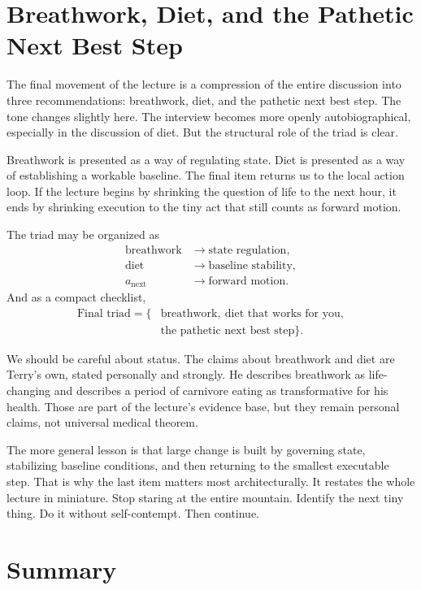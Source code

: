 \section{Breathwork, Diet, and the Pathetic Next Best Step}

The final movement of the lecture is a compression of the entire discussion into three recommendations: breathwork, diet, and the pathetic next best step. The tone changes slightly here. The interview becomes more openly autobiographical, especially in the discussion of diet. But the structural role of the triad is clear.

Breathwork is presented as a way of regulating state. Diet is presented as a way of establishing a workable baseline. The final item returns us to the local action loop. If the lecture begins by shrinking the question of life to the next hour, it ends by shrinking execution to the tiny act that still counts as forward motion.

The triad may be organized as
\begin{align}
\text{breathwork} &\rightarrow \text{state regulation},\\
\text{diet} &\rightarrow \text{baseline stability},\\
a_{\text{next}} &\rightarrow \text{forward motion}.
\end{align}
And as a compact checklist,
\begin{align}
\text{Final triad} = \{&\text{breathwork},\ \text{diet that works for you},\\
&\text{the pathetic next best step}\}.
\end{align}

We should be careful about status. The claims about breathwork and diet are Terry's own, stated personally and strongly. He describes breathwork as life-changing and describes a period of carnivore eating as transformative for his health. Those are part of the lecture's evidence base, but they remain personal claims, not universal medical theorem.

The more general lesson is that large change is built by governing state, stabilizing baseline conditions, and then returning to the smallest executable step. That is why the last item matters most architecturally. It restates the whole lecture in miniature. Stop staring at the entire mountain. Identify the next tiny thing. Do it without self-contempt. Then continue.

\section{Summary}

